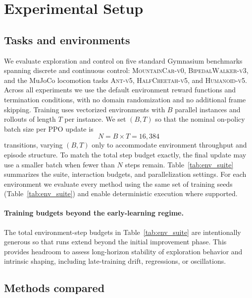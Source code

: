 \section{Experimental Setup}
\label{sec:experimental_setup}

\subsection{Tasks and environments}

We evaluate exploration and control on five standard Gymnasium benchmarks spanning discrete and continuous control: \textsc{MountainCar-v0}, \textsc{BipedalWalker-v3}, and the MuJoCo locomotion tasks \textsc{Ant-v5}, \textsc{HalfCheetah-v5}, and \textsc{Humanoid-v5}.
Across all experiments we use the default environment reward functions and termination conditions, with no domain randomization and no additional frame skipping.
Training uses vectorized environments with $B$ parallel instances and rollouts of length $T$ per instance.
We set $(B,T)$ so that the nominal on-policy batch size per PPO update is
\begin{equation}
    N = B \times T = 16{,}384
\end{equation}
transitions, varying $(B,T)$ only to accommodate environment throughput and episode structure.
To match the total step budget exactly, the final update may use a smaller batch when fewer than $N$ steps remain.
Table~\ref{tab:env_suite} summarizes the suite, interaction budgets, and parallelization settings.
For each environment we evaluate every method using the same set of training seeds (Table~\ref{tab:env_suite}) and enable deterministic execution where supported.

\paragraph{Training budgets beyond the early-learning regime.}
The total environment-step budgets in Table~\ref{tab:env_suite} are intentionally generous so that runs extend beyond the initial improvement phase.
This provides headroom to assess long-horizon stability of exploration behavior and intrinsic shaping, including late-training drift, regressions, or oscillations.



\subsection{Methods compared}
\label{sec:experimental_setup:methods}

